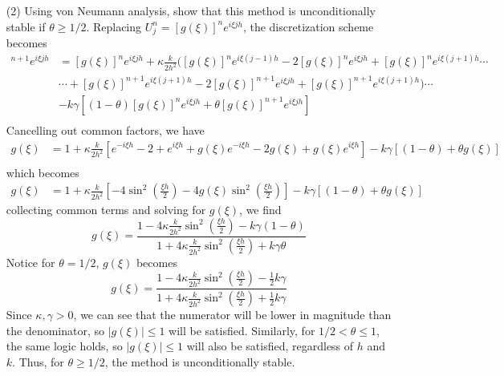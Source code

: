 \documentclass{article}
\begin{document}
\begin{itemize}
    \item[(2)] Using von Neumann analysis, show that this method is unconditionally stable if $\theta \geq 1/2$.
    \newline\newline
    Replacing $U_j^n = [g(\xi)]^ne^{i\xi jh}$, the discretization scheme becomes
    \begin{align*}
        [g(\xi)]^{n+1}e^{i\xi jh} &= [g(\xi)]^ne^{i\xi j h} + \kappa\frac{k}{2h^2}([g(\xi)]^ne^{i\xi(j-1)h} - 2[g(\xi)]^ne^{i\xi jh} + [g(\xi)]^ne^{i\xi(j+1)h} \cdots \\
        &\cdots + [g(\xi)]^{n+1}e^{i\xi(j+1)h} -2[g(\xi)]^{n+1}e^{i\xi j h} + [g(\xi)]^{n+1}e^{i\xi(j+1)h}) \cdots \\
        & - k\gamma\left[(1-\theta)[g(\xi)]^ne^{i\xi jh} + \theta[g(\xi)]^{n+1}e^{i\xi jh}\right] \\
    \end{align*}
    Cancelling out common factors, we have
    \begin{align*}
        g(\xi) &= 1 + \kappa\frac{k}{2h^2}\left[e^{-i\xi h} - 2 + e^{i\xi h} + g(\xi)e^{-i\xi h} - 2g(\xi) + g(\xi)e^{i\xi h}\right] - k\gamma[(1-\theta) + \theta g(\xi)] \\
    \end{align*}
    which becomes
    \begin{align*}
        g(\xi) &= 1 + \kappa\frac{k}{2h^2}\left[-4\sin^2\left(\frac{\xi h}{2}\right) - 4g(\xi)\sin^2\left(\frac{\xi h}{2}\right)\right] - k\gamma[(1-\theta) + \theta g(\xi)]
    \end{align*}
    collecting common terms and solving for $g(\xi)$, we find
    \begin{equation}
        g(\xi) = \frac{1 - 4\kappa\frac{k}{2h^2}\sin^2\left(\frac{\xi h}{2}\right) - k\gamma(1 - \theta)}{1 + 4\kappa\frac{k}{2h^2}\sin^2\left(\frac{\xi h}{2}\right) + k\gamma \theta}
    \end{equation}
    Notice for $\theta = 1/2$, $g(\xi)$ becomes
    \[g(\xi) = \frac{1 - 4\kappa\frac{k}{2h^2}\sin^2\left(\frac{\xi h}{2}\right) - \frac{1}{2}k\gamma}{1 + 4\kappa\frac{k}{2h^2}\sin^2\left(\frac{\xi h}{2}\right) + \frac{1}{2}k\gamma}\]
    Since $\kappa, \gamma > 0$, we can see that the numerator will be lower in magnitude than the denominator, so $|g(\xi)| \leq 1$ will be satisfied. Similarly, for $ 1/2 < \theta \leq 1$, the same logic holds, so $|g(\xi)| \leq 1$ will also be satisfied, regardless of $h$ and $k$. Thus, for $\theta \geq 1/2$, the method is unconditionally stable.
    

\end{itemize}
\end{document}
